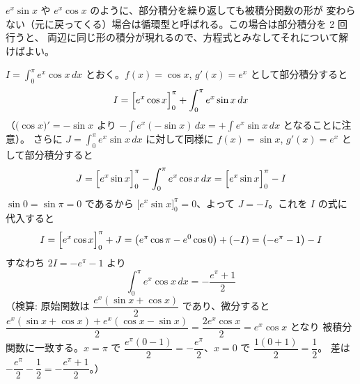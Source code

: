 
$e^{x}\sin x$ や $e^{x}\cos x$ のように、部分積分を繰り返しても被積分関数の形が
変わらない（元に戻ってくる）場合は循環型と呼ばれる。この場合は部分積分を 2 回行うと、
両辺に同じ形の積分が現れるので、方程式とみなしてそれについて解けばよい。

$I = \displaystyle\int_{0}^{\pi} e^{x}\cos x\,dx$ とおく。$f(x) = \cos x$, $g'(x) = e^{x}$ として部分積分すると
\[
I = \Bigl[e^{x}\cos x\Bigr]_{0}^{\pi} + \int_{0}^{\pi} e^{x}\sin x\,dx
\]
（$\bigl(\cos x\bigr)' = -\sin x$ より $-\int e^x(-\sin x)\,dx = +\int e^x\sin x\,dx$ となることに注意）。
さらに $J = \displaystyle\int_{0}^{\pi} e^{x}\sin x\,dx$ に対して同様に $f(x)=\sin x$, $g'(x)=e^{x}$ として部分積分すると
\[
J = \Bigl[e^{x}\sin x\Bigr]_{0}^{\pi} - \int_{0}^{\pi} e^{x}\cos x\,dx
= \Bigl[e^{x}\sin x\Bigr]_{0}^{\pi} - I
\]
$\sin 0 = \sin\pi = 0$ であるから $\bigl[e^{x}\sin x\bigr]_{0}^{\pi} = 0$、よって $J = -I$。これを $I$ の式に代入すると
\[
I = \Bigl[e^{x}\cos x\Bigr]_{0}^{\pi} + J = \bigl(e^{\pi}\cos\pi - e^{0}\cos 0\bigr) + (-I)
= \bigl(-e^{\pi} - 1\bigr) - I
\]
すなわち $2I = -e^{\pi} - 1$ より
\[
\boxed{\; \int_{0}^{\pi} e^{x}\cos x\,dx = -\frac{e^{\pi}+1}{2} \;}
\]
（検算: 原始関数は $\dfrac{e^{x}(\sin x + \cos x)}{2}$ であり、微分すると
$\dfrac{e^{x}(\sin x+\cos x) + e^{x}(\cos x-\sin x)}{2} = \dfrac{2e^{x}\cos x}{2} = e^{x}\cos x$ となり
被積分関数に一致する。$x=\pi$ で $\dfrac{e^{\pi}(0-1)}{2}=-\dfrac{e^{\pi}}{2}$、$x=0$ で $\dfrac{1(0+1)}{2}=\dfrac12$。
差は $-\dfrac{e^{\pi}}{2}-\dfrac12=-\dfrac{e^{\pi}+1}{2}$。）
